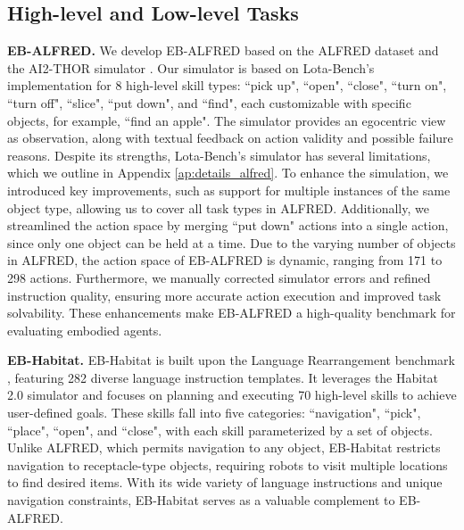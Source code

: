 \subsection{High-level and Low-level Tasks}
\textbf{EB-ALFRED.} We develop EB-ALFRED based on the ALFRED dataset \cite{shridhar2020alfred} and the AI2-THOR simulator \cite{kolve2017ai2}. 
Our simulator is based on Lota-Bench's implementation \cite{choi2024lota} for 8 high-level skill types: ``pick up", ``open", ``close", ``turn on", ``turn off", ``slice", ``put down", and ``find", each customizable with specific objects, for example, ``find an apple". The simulator provides an egocentric view as observation, along with textual feedback on action validity and possible failure reasons.
Despite its strengths, Lota-Bench's simulator has several limitations, which we outline in Appendix \ref{ap:details_alfred}. To enhance the simulation, we introduced key improvements, such as support for multiple instances of the same object type, allowing us to cover all task types in ALFRED. Additionally, we streamlined the action space by merging ``put down" actions into a single action, since only one object can be held at a time. Due to the varying number of objects in ALFRED, the action space of EB-ALFRED is dynamic, ranging from 171 to 298 actions. Furthermore, we manually corrected simulator errors and refined instruction quality, ensuring more accurate action execution and improved task solvability. These enhancements make EB-ALFRED a high-quality benchmark for evaluating embodied agents.







\textbf{EB-Habitat.} EB-Habitat is built upon the Language Rearrangement benchmark \cite{szot2023large}, featuring 282 diverse language instruction templates. It leverages the Habitat 2.0 simulator \cite{szot2021habitat} and focuses on planning and executing 70 high-level skills to achieve user-defined goals. These skills fall into five categories: ``navigation", ``pick", ``place", ``open", and ``close", with each skill parameterized by a set of objects. Unlike ALFRED, which permits navigation to any object, EB-Habitat restricts navigation to receptacle-type objects, requiring robots to visit multiple locations to find desired items. With its wide variety of language instructions and unique navigation constraints, EB-Habitat serves as a valuable complement to EB-ALFRED.



